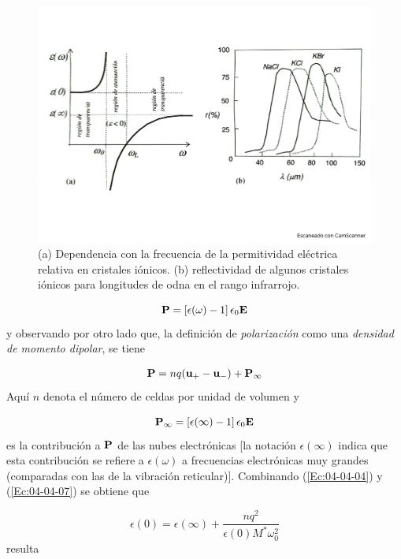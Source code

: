 \begin{figure}[h!] \centering
	\includegraphics[scale=0.4]{Cuerpo/Ch_04/Fotos libro 8.pdf}
	\caption{(a) Dependencia con la frecuencia de la permitividad eléctrica relativa en cristales iónicos. (b) reflectividad de algunos cristales iónicos para longitudes de odna en el rango infrarrojo.}
	\label{Fig:04-08}
\end{figure}    


\begin{equation}
	\mathbf{P} = \left[ \epsilon (\omega) -1  \right] \epsilon_0  \mathbf{E}
\end{equation}
y observando por otro lado que, la definición de \textit{polarización} como una \textit{densidad de momento dipolar}, se tiene  

\begin{eqnarray}
	\mathbf{P} = n q (\mathbf{u}_+ - \mathbf{u}_-) + \mathbf{P}_\infty
\end{eqnarray}
Aquí $n$ denota el número de celdas por unidad de volumen y 

\begin{equation}
	\mathbf{P}_\infty = \left[ \epsilon (\infty) -1  \right] \epsilon_0 \mathbf{E}\label{Ec:04-04-07}
\end{equation}
es la contribución a $\mathbf{P}$ de las nubes electrónicas [la notación $\epsilon (\infty)$ indica que esta contribución se refiere a $\epsilon (\omega)$ a frecuencias electrónicas muy grandes (comparadas con las de la vibración reticular)]. Combinando (\ref{Ec:04-04-04}) y (\ref{Ec:04-04-07}) se obtiene que

\begin{equation}
	\epsilon(0) = \epsilon(\infty)  + \frac{nq^2}{\epsilon(0) M^*\omega_0^2}
\end{equation}
resulta 


